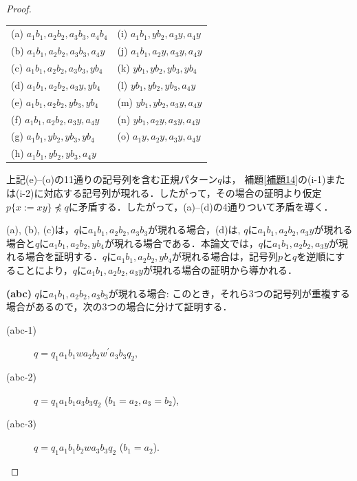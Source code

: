 \begin{proof}
\noindent
\noindent\begin{tabular}{ll}
(a) $a_{1}b_{1}, a_{2}b_{2}, a_{3}b_{3}, a_{4}b_{4}$    & (i) $a_{1}b_{1}, yb_{2}, a_{3}y, a_{4}y$ \\
(b) $a_{1}b_{1}, a_{2}b_{2}, a_{3}b_{3}, a_{4}y$        & (j) $a_{1}b_{1}, a_{2}y, a_{3}y, a_{4}y$ \\
(c) $a_{1}b_{1}, a_{2}b_{2}, a_{3}b_{3}, yb_{4}$        & (k) $yb_{1}, yb_{2}, yb_{3}, yb_{4}$ \\
(d) $a_{1}b_{1}, a_{2}b_{2}, a_{3}y, yb_{4}$            & (l) $yb_{1}, yb_{2}, yb_{3}, a_{4}y$ \\
(e) $a_{1}b_{1}, a_{2}b_{2}, yb_{3}, yb_{4}$            & (m) $yb_{1}, yb_{2}, a_{3}y, a_{4}y$ \\
(f) $a_{1}b_{1}, a_{2}b_{2}, a_{3}y, a_{4}y$            & (n) $yb_{1}, a_{2}y, a_{3}y, a_{4}y$ \\
(g) $a_{1}b_{1}, yb_{2}, yb_{3}, yb_{4}$                & (o) $a_{1}y, a_{2}y, a_{3}y, a_{4}y$ \\
(h) $a_{1}b_{1}, yb_{2}, yb_{3}, a_{4}y$  &
\end{tabular}
\smallskip

\noindent
上記(e)--(o)の11通りの記号列を含む正規パターン$q$は，
補題\ref{補題14}の(i-1)または(i-2)に対応する記号列が現れる．したがって，その場合の証明より仮定$p \{ x := xy \} \not\preceq q$に矛盾する．したがって，(a)--(d)の4通りついて矛盾を導く．

(a), (b), (c)は，$q$に$a_{1}b_{1}, a_{2}b_{2}, a_{3}b_{3}$が現れる場合，(d)は, $q$に$a_{1}b_{1}, a_{2}b_{2}, a_{3}y$が現れる場合と$q$に$a_{1}b_{1}, a_{2}b_{2}, yb_{4}$が現れる場合である．本論文では，$q$に$a_{1}b_{1}, a_{2}b_{2}, a_{3}y$が現れる場合を証明する．$q$に$a_{1}b_{1}, a_{2}b_{2}, yb_{4}$が現れる場合は，記号列$p$と$q$を逆順にすることにより，$q$に$a_{1}b_{1}, a_{2}b_{2}, a_{3}y$が現れる場合の証明から導かれる．
\smallskip

\noindent
\textbf{(abc)} $q$に$a_{1}b_{1}, a_{2}b_{2}, a_{3}b_{3}$が現れる場合: このとき，それら3つの記号列が重複する場合があるので，次の3つの場合に分けて証明する．

\begin{description}
\item[(abc-1)] $q=q_{1}a_{1}b_{1}wa_{2}b_{2}w^{\prime}a_{3}b_{3}q_{2}$,
\item[(abc-2)] $q=q_{1}a_{1}b_{1}a_{3}b_{3}q_{2}$ ($b_{1}=a_{2}, a_{3}=b_{2}$),
\item[(abc-3)] $q=q_{1}a_{1}b_{1}b_{2}wa_{3}b_{3}q_{2}$ ($b_{1}=a_{2}$).
\end{description}


\end{proof}
